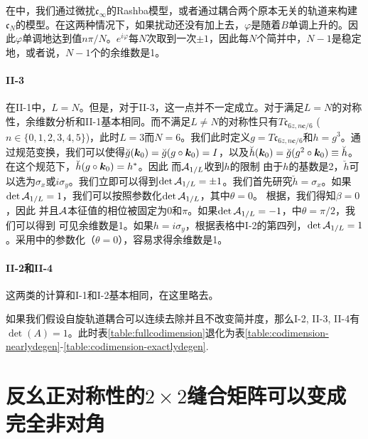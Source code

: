 \begin{appendices}
在中，我们通过微扰$\mathfrak{c}_\infty$的Rashba模型，或者通过耦合两个原本无关的轨道来构建$\mathfrak{c}_N$的模型。在这两种情况下，如果扰动还没有加上去，$\varphi$是随着$B$单调上升的。因此$\varphi$单调地达到值$n\pi/N$。$e^{i\varphi}$每$N$次取到一次$\pm 1$，因此每$N$个简并中，$N-1$是稳定地，或者说，$N-1$个的余维数是1。

\paragraph*{II-3} 在II-1中，$L=N$。但是，对于II-3，这一点并不一定成立。对于满足$L=N$的对称性，余维数分析和II-1基本相同。而不满足$L\ne N$的对称性只有$T\mathfrak{c}_{6z,n\boldsymbol{c}/6}$ ($n\in\{0,1,2,3,4,5\}$)，此时$L=3$而$N=6$。我们此时定义$g=T\mathfrak{c}_{6z,n\boldsymbol{c}/6}$和$h=g^3$。通过规范变换，我们可以使得$\breve{g}(\boldsymbol{k}_0)=\breve{g}(g\circ\boldsymbol{k}_0)=I$，以及$\breve{h}(\boldsymbol{k}_0)=\breve{g}(g^2\circ \boldsymbol{k}_0)\equiv\breve{h}$。在这个规范下，$\breve{h}(g\circ\boldsymbol{k}_0)=h^*$。因此
而${\cal A}_{1/L}$收到$h$的限制 
由于$h$的基数是2，$\breve{h}$可以选为$\sigma_x$或$i\sigma_y$。我们立即可以得到$\det {\cal A}_{1/L} = \pm 1$。我们首先研究$\breve{h}=\sigma_x$。如果$\det {\cal A}_{1/L} = 1$，我们可以按照参数化$\det {\cal A}_{1/L}$，其中$\theta=0$。 根据，我们得知$\beta=0$，因此 
并且${\cal A}$本征值的相位被固定为$0$和$\pi$。如果$\det{{\cal A}_{1/L}}=-1$，中$\theta=\pi/2$，我们可以得到
可见余维数是1。如果$h=i\sigma_y$，根据表格中I-2的第四列，$\det {\cal A}_{1/L}=1$。采用中的参数化（$\theta=0$），容易求得余维数是1。

\paragraph*{II-2和II-4} 这两类的计算和I-1和I-2基本相同，在这里略去。

如果我们假设自旋轨道耦合可以连续去除并且不改变简并度，那么I-2, II-3, II-4有$\det(A)=1$。此时表\ref{table:fullcodimension}退化为表\ref{table:codimension-nearlydegen}-\ref{table:codimension-exactlydegen}.

\section{反幺正对称性的$2\times 2$缝合矩阵可以变成完全非对角\label{app:makinggoffdiagonal}}


\end{appendices}
